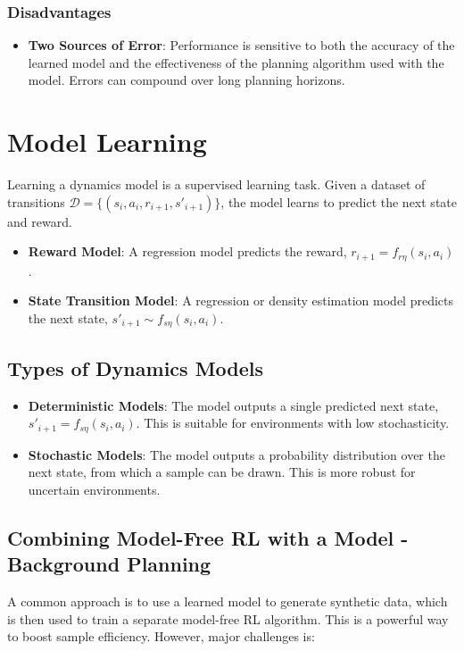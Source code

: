 \documentclass[12pt]{article}
\begin{document}
\subsubsection{Disadvantages}
\begin{itemize}
    \item \textbf{Two Sources of Error}: Performance is sensitive to both the accuracy of the learned model and the effectiveness of the planning algorithm used with the model. Errors can compound over long planning horizons.
\end{itemize}

\section{Model Learning }
Learning a dynamics model is a supervised learning task. Given a dataset of transitions $\mathcal{D} = \{(s_i, a_i, r_{i+1}, s'_{i+1})\}$, the model learns to predict the next state and reward.
\begin{itemize}
    \item \textbf{Reward Model}: A regression model predicts the reward, $r_{i+1} = f_{r\eta}(s_i, a_i)$.
    \item \textbf{State Transition Model}: A regression or density estimation model predicts the next state, $s'_{i+1} \sim f_{s\eta}(s_i, a_i)$.
\end{itemize}

\subsection{Types of Dynamics Models}
\begin{itemize}
    \item \textbf{Deterministic Models}: The model outputs a single predicted next state, $s'_{i+1} = f_{s\eta}(s_i, a_i)$. This is suitable for environments with low stochasticity.
    \item \textbf{Stochastic Models}: The model outputs a probability distribution over the next state, from which a sample can be drawn. This is more robust for uncertain environments.
\end{itemize}

\subsection{Combining Model-Free RL with a Model - Background Planning}
A common approach is to use a learned model to generate synthetic data, which is then used to train a separate model-free RL algorithm. This is a powerful way to boost sample efficiency. However, major challenges is:
\end{document}
